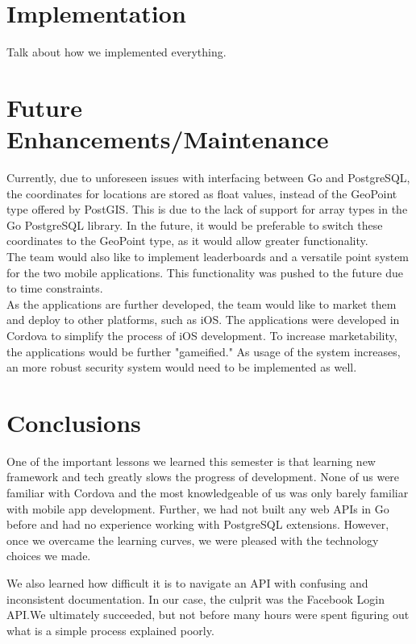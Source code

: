 \documentclass{article}
\begin{document}
\section{Implementation}
Talk about how we implemented everything.

\section{Future Enhancements/Maintenance}
Currently, due to unforeseen issues with interfacing between Go and PostgreSQL, the coordinates for locations are stored as float values, instead of the GeoPoint type offered by PostGIS. This is due to the lack of support for array types in the Go PostgreSQL library. In the future, it would be preferable to switch these coordinates to the GeoPoint type, as it would allow greater functionality.\\

The team would also like to implement leaderboards and a versatile point system for the two mobile applications. This functionality was pushed to the future due to time constraints. \\

As the applications are further developed, the team would like to market them and deploy to other platforms, such as iOS. The applications were developed in Cordova to simplify the process of iOS development. To increase marketability, the applications would be further "gameified." As usage of the system increases, an more robust security system would need to be implemented as well.

\section{Conclusions}

One of the important lessons we learned this semester is that learning new
framework and tech greatly slows the progress of development. None of us were
familiar with Cordova and the most knowledgeable of us was only barely familiar
with mobile app development. Further, we had not built any web APIs in Go
before and had no experience working with PostgreSQL extensions. However, once
we overcame the learning curves, we were pleased with the technology choices we
made.

We also learned how difficult it is to navigate an API with confusing and
inconsistent documentation. In our case, the culprit was the Facebook Login
API.\@ We ultimately succeeded, but not before many hours were spent figuring out
what is a simple process explained poorly.
\end{document}
